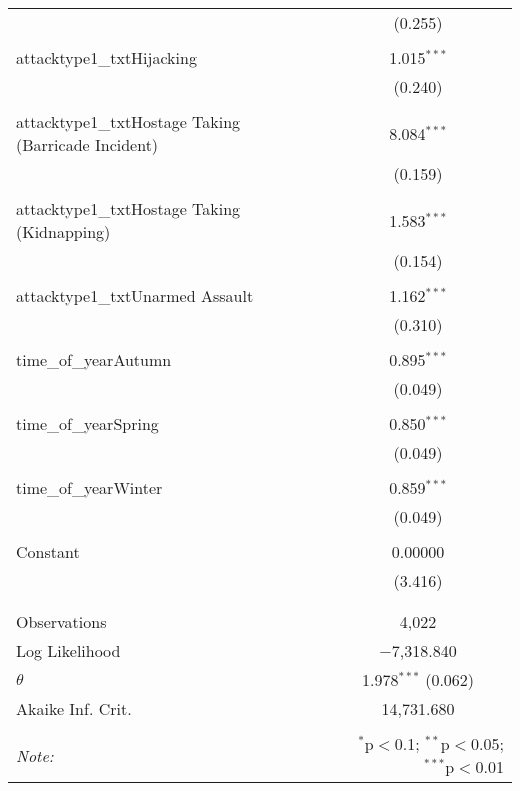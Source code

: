 \begin{table}[!htbp]
\begin{tabular}{@{\extracolsep{0.1pt}}lc}
  & (0.255) \\ 
  & \\ 
 attacktype1\_txtHijacking & 1.015$^{***}$ \\ 
  & (0.240) \\ 
  & \\ 
 attacktype1\_txtHostage Taking (Barricade Incident) & 8.084$^{***}$ \\ 
  & (0.159) \\ 
  & \\ 
 attacktype1\_txtHostage Taking (Kidnapping) & 1.583$^{***}$ \\ 
  & (0.154) \\ 
  & \\ 
 attacktype1\_txtUnarmed Assault & 1.162$^{***}$ \\ 
  & (0.310) \\ 
  & \\ 
 time\_of\_yearAutumn & 0.895$^{***}$ \\ 
  & (0.049) \\ 
  & \\ 
 time\_of\_yearSpring & 0.850$^{***}$ \\ 
  & (0.049) \\ 
  & \\ 
 time\_of\_yearWinter & 0.859$^{***}$ \\ 
  & (0.049) \\ 
  & \\ 
 Constant & 0.00000 \\ 
  & (3.416) \\ 
  & \\ 
\hline \\[-1.8ex] 
Observations & 4,022 \\ 
Log Likelihood & $-$7,318.840 \\ 
$\theta$ & 1.978$^{***}$  (0.062) \\ 
Akaike Inf. Crit. & 14,731.680 \\ 
\hline 
\hline \\[-1.8ex] 
\textit{Note:}  & \multicolumn{1}{r}{$^{*}$p$<$0.1; $^{**}$p$<$0.05; $^{***}$p$<$0.01} \\ 
\end{tabular} 
\end{table} 
